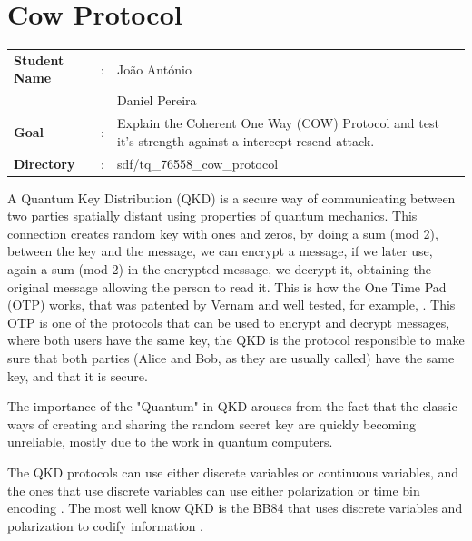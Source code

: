 \clearpage
\section{Cow Protocol}

\begin{refsection}

\begin{tcolorbox}	
\begin{tabular}{p{2.75cm} p{0.2cm} p{10.5cm}} 	
\textbf{Student Name}  &:&  Jo\~ao Ant\'onio\\
\textbf{}  & &  Daniel Pereira\\
\textbf{Goal}          &:& Explain the Coherent One Way (COW) Protocol and test it's strength against a intercept resend attack.\\
\textbf{Directory}     &:& sdf/tq\_76558\_cow\_protocol
\end{tabular}
\end{tcolorbox}

A Quantum Key Distribution (QKD) is a secure way of communicating between two parties spatially distant using properties of quantum mechanics. This connection creates random key with ones and zeros, by doing a sum (mod 2), between the key and the message, we can encrypt a message, if we later use, again a sum (mod 2) in the encrypted message, we decrypt it, obtaining the original message allowing the person to read it. This is how the One Time Pad (OTP) works, that was patented by Vernam and well tested, for example, \cite{glover2005one}. This OTP is one of the protocols that can be used to encrypt and decrypt messages, where both users have the same key, the QKD is the protocol responsible to make sure that both parties (Alice and Bob, as they are usually called) have the same key, and that it is secure.

The importance of the "Quantum" in QKD arouses from the fact that the classic ways of creating and sharing the random secret key are quickly becoming unreliable, mostly due to the work in quantum computers.

The QKD protocols can use either discrete variables or continuous variables, and the ones that use discrete variables can use either polarization or time bin encoding \cite{singh}. The most well know QKD is the BB84 that uses discrete variables and polarization to codify information \cite{bennett1992quantum}.


\end{refsection}

